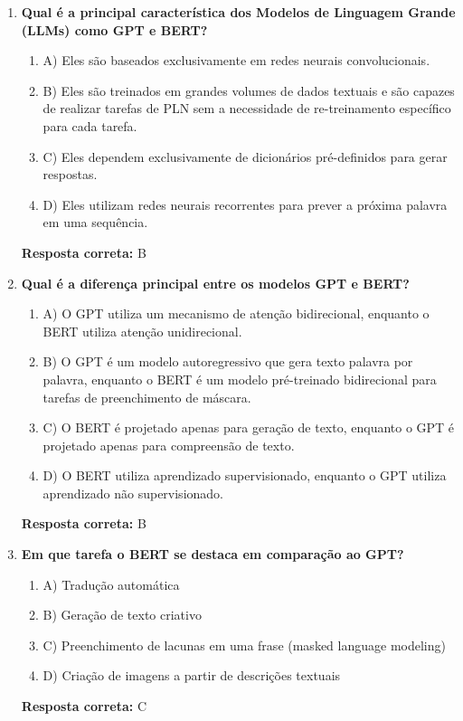 \documentclass[14pt,a4paper,oneside]{book}
\begin{document}
\begin{enumerate}
	
	\item \textbf{Qual é a principal característica dos Modelos de Linguagem Grande (LLMs) como GPT e BERT?}
	\begin{enumerate}[label=\alph*)]
		\item A) Eles são baseados exclusivamente em redes neurais convolucionais.
		\item B) Eles são treinados em grandes volumes de dados textuais e são capazes de realizar tarefas de PLN sem a necessidade de re-treinamento específico para cada tarefa.
		\item C) Eles dependem exclusivamente de dicionários pré-definidos para gerar respostas.
		\item D) Eles utilizam redes neurais recorrentes para prever a próxima palavra em uma sequência.
	\end{enumerate}
	\vspace{5mm}
	\textbf{Resposta correta:} B
	
	\item \textbf{Qual é a diferença principal entre os modelos GPT e BERT?}
	\begin{enumerate}[label=\alph*)]
		\item A) O GPT utiliza um mecanismo de atenção bidirecional, enquanto o BERT utiliza atenção unidirecional.
		\item B) O GPT é um modelo autoregressivo que gera texto palavra por palavra, enquanto o BERT é um modelo pré-treinado bidirecional para tarefas de preenchimento de máscara.
		\item C) O BERT é projetado apenas para geração de texto, enquanto o GPT é projetado apenas para compreensão de texto.
		\item D) O BERT utiliza aprendizado supervisionado, enquanto o GPT utiliza aprendizado não supervisionado.
	\end{enumerate}
	\vspace{5mm}
	\textbf{Resposta correta:} B
	
	\item \textbf{Em que tarefa o BERT se destaca em comparação ao GPT?}
	\begin{enumerate}[label=\alph*)]
		\item A) Tradução automática
		\item B) Geração de texto criativo
		\item C) Preenchimento de lacunas em uma frase (masked language modeling)
		\item D) Criação de imagens a partir de descrições textuais
	\end{enumerate}
	\vspace{5mm}
	\textbf{Resposta correta:} C
	

\end{enumerate}
\end{document}
